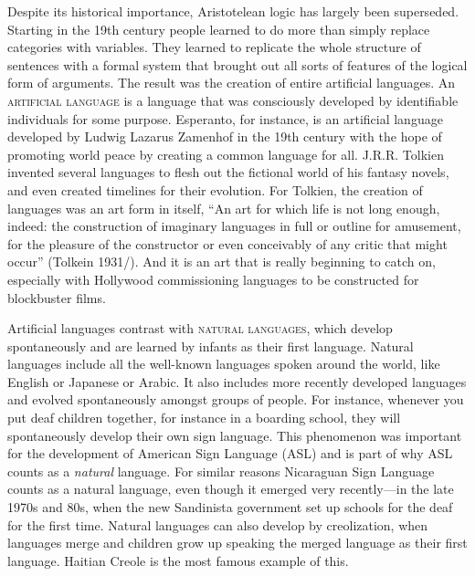 Despite its historical importance, Aristotelean logic has largely been superseded. Starting in the 19th century people learned to do more than simply replace categories with variables. They learned to replicate the whole structure of sentences with a formal system that brought out all sorts of features of the logical form of arguments. The result was the creation of entire artificial languages. An \textsc{\gls{artificial language}} \label{def:artificial_language} is a language that was consciously developed by identifiable individuals for some purpose. Esperanto, for instance, is an artificial language developed by Ludwig Lazarus Zamenhof in the 19th century with the hope of promoting world peace by creating a common language for all. J.R.R. Tolkien invented several languages to flesh out the fictional world of his fantasy novels, and even created timelines for their evolution. For Tolkien, the creation of languages was an art form in itself, ``An art for which life is not long enough, indeed: the construction of imaginary languages in full or outline for amusement, for the pleasure of the constructor or even conceivably of any critic that might occur'' (Tolkein 1931/\citeyear{Tolkein1931}). And it is an art that is really beginning to catch on, especially with Hollywood commissioning languages to be constructed for blockbuster films. 

Artificial languages contrast with \textsc{\glspl{natural language}}, \label{def:natural_language} which develop spontaneously and are learned by infants as their first language. Natural languages include all the well-known languages spoken around the world, like English or Japanese or Arabic. It also includes more recently developed languages and evolved spontaneously amongst groups of people. For instance, whenever you put deaf children together, for instance in a boarding school, they will spontaneously develop their own sign language. This phenomenon was important for the development of American Sign Language (ASL) and is part of why ASL counts as a \textit{natural} language. For similar reasons Nicaraguan Sign Language counts as a natural language, even though it emerged very recently---in the late 1970s and 80s, when the new Sandinista government set up schools for the deaf for the first time. Natural languages can also develop by creolization, when languages merge and children grow up speaking the merged language as their first language. Haitian Creole is the most famous example of this.   

